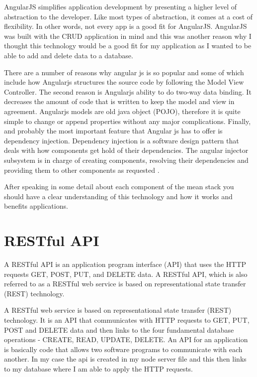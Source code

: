 AngularJS simplifies application development by presenting a higher level of abstraction to the developer. Like most types of abstraction, it comes at a cost of flexibility. In other words, not every app is a good fit for AngularJS. AngularJS was built with the CRUD application in mind and this was another reason why I thought this technology would be a good fit for my application as I wanted to be able to add and delete data to a database. \cite{angularjsa}
 
There are a number of reasons why angular js is so popular and some of which include how Angularjs structures the source code by following
the Model View Controller. The second reason is  Angularjs ability to do two-way data binding. It decreases the amount of code
that is written to keep the model and view in agreement.  Angularjs
models are old java object (POJO), therefore it is quite simple to change or
append properties without any major complications. Finally, and probably the most important
feature that Angular js has to offer is dependency injection. Dependency injection
is a software design pattern that deals with how components get hold of
their dependencies. The angular injector subsystem is in charge of creating components, resolving their dependencies and providing them to other
components as requested \cite{angularjsfeat}.

After speaking in some detail about each component of the mean stack you should have a clear understanding of this technology and how it works and benefits applications.  


\section{RESTful API}
A RESTful API is an application program interface (API) that uses the HTTP requests GET, POST, PUT, and DELETE data. A RESTful API, which is also referred to as a RESTful web service is based on representational state transfer (REST) technology\cite{Restapi}. 

A RESTful web service is based on representational state transfer (REST) technology. It is an API that communicates with HTTP requests to GET, PUT, POST and DELETE data and then links to the four fundamental database operations - CREATE, READ, UPDATE, DELETE. An API for an application is basically code that allows two software programs to communicate with each another. In my case the api is created in my node server file and this then links to my database where I am able to apply the HTTP requests. 

